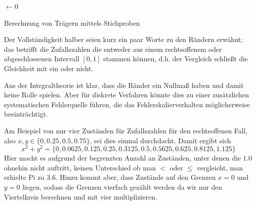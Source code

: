 \begin{algorithm}
    \DontPrintSemicolon
    \BlankLine
    \sum$\leftarrow 0$\;
    \caption{Berechnung von Trägern mittels Stichproben}
    \label{alg:montepi}
\end{algorithm}


Der Vollständigkeit halber seien kurz ein paar Worte zu den Rändern erwähnt; das betrifft die Zufallszahlen die entweder aus einem rechtsoffenem oder abgeschlossenen Intervall $[0,1]$ stammen können, d.h. der Vergleich schließt die Gleichheit mit ein oder nicht.

Aus der Integraltheorie ist klar, dass die Ränder ein Nullmaß haben und damit keine Rolle spielen. Aber für diskrete Verfahren könnte dies zu einer zusätzlichen systematischen Fehlerquelle führen, die das Fehlerskalierverhalten möglicherweise beeinträchtigt.

Am Beispiel von nur vier Zuständen für Zufallszahlen für den rechtsoffenen Fall, also $x,y\in \lbrace 0,0.25,0.5,0.75 \rbrace$, sei dies einmal durchdacht. Damit ergibt sich
\begin{equation}
	x^2+y^2 = \lbrace 0, 0.0625, 0.125, 0.25, 0.3125, 0.5, 0.5625, 0.625, 0.8125, 1.125 \rbrace
\end{equation}
Hier macht es aufgrund der begrenzten Anzahl an Zuständen, unter denen die $1.0$ ohnehin nicht auftritt, keinen Unterschied ob man $<$ oder $\leq$ vergleicht, man erhielte Pi zu $3.6$.
Hinzu kommt aber, dass Zustände auf den Grenzen $x=0$ und $y=0$ liegen, sodass die Grenzen vierfach gezählt werden da wir nur den Viertelkreis berechnen und mit vier multiplizieren.


